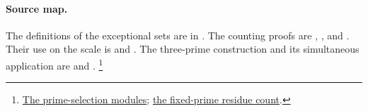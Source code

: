 \paragraph{Source map.}
The definitions of the exceptional sets are in
. The counting proofs
are ,
, and
. Their use on the scale is
 and .
The three-prime construction and its simultaneous application are
 and
.
\footnote{\href{https://github.com/Deicyde/riemann-hypothesis/tree/40e56bab026552e089d7afcfeff08d2defb9c005/src/Development/AutomorphicArithmetic/ShortNorms}{The prime-selection modules};
\href{https://github.com/Deicyde/riemann-hypothesis/blob/40e56bab026552e089d7afcfeff08d2defb9c005/src/Development/AbelianVarietyTheory/Proofs/FoundationProofs/DivLeRpowThreeQuarters.lean}{the fixed-prime residue count}.}
